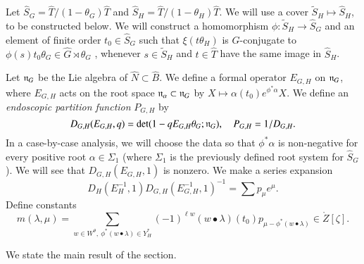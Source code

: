 Let $\hat S_G = \hat T/(1-\theta_G)\hat T$ and $\hat S_H = \hat T/(1-\theta_H)\hat T$.
We will use a cover $\tilde S_H\mapsto \hat S_H$, to be constructed below.
We will construct a homomorphism $\phi:\tilde S_H\to \hat S_G$ and an element of finite order $t_0\in \hat S_G$ such that
$\xi(t\theta_H)$ is $\hat G$-conjugate to $\phi(s) t_0\theta_G\in \hat G\rtimes\theta_G$ , 
whenever $s\in \tilde S_H$ and $t\in \hat T$ have the same image in $\hat S_H$.



Let ${\mathfrak n}_G$ be the Lie algebra of $\hat N\subset \hat B$.
We define a formal operator
$E_{G,H}$ on ${\mathfrak n}_G$, where $E_{G,H}$ acts on the root space ${\mathfrak n}_\alpha\subset {\mathfrak n}_G$ by
$X\mapsto \alpha(t_0) e^{\phi^*\alpha} X$.
We define an {\it endoscopic partition function} $P_{G,H}$ by
\begin{equation}
D_{G,H}(E_{G,H},q) = \det(1 - q E_{G,H} \theta_G;{\mathfrak n}_G),\quad P_{G,H} = 1/D_{G,H}.
\end{equation}
In a case-by-case analysis, we will choose the data so that $\phi^*\alpha$ is non-negative for every positive
root $\alpha\in\Sigma_1$ (where $\Sigma_1$ is the previously defined root system for $\hat S_G$).   
We will see that $D_{G,H}(E_{G,H},1)$ is nonzero.
We make a series expansion
\begin{equation}
 D_H(E^{-1}_H,1)D_{G,H}(E^{-1}_{G,H},1)^{-1} = \sum p_\mu e^\mu.
\end{equation}
Define constants 
\begin{equation}\label{eqn:branch}
m(\lambda,\mu) = \sum_{w\in W^\theta, ~\phi^*({w\bullet\lambda})\in  Y^*_H} (-1)^{\ell w} ({w\bullet\lambda})(t_0)
p_{\mu-\phi^*(w\bullet\lambda)} \in \ring{Z}[\zeta].
\end{equation}



We state the main result of the section.

